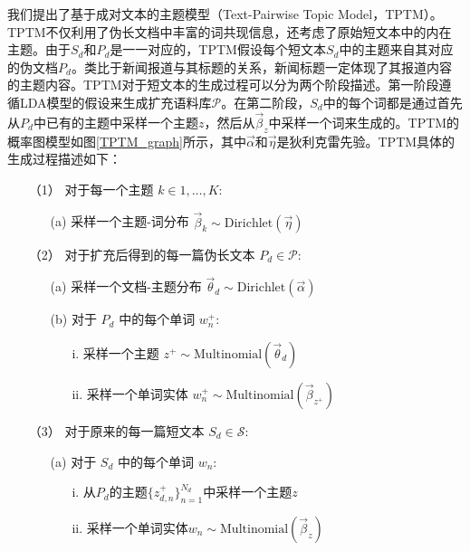 我们提出了基于成对文本的主题模型（Text-Pairwise Topic Model，TPTM）。TPTM不仅利用了伪长文档中丰富的词共现信息，还考虑了原始短文本中的内在主题。由于$S_d$和$P_d$是一一对应的，TPTM假设每个短文本$S_d$中的主题来自其对应的伪文档$P_d$。类比于新闻报道与其标题的关系，新闻标题一定体现了其报道内容的主题内容。TPTM对于短文本的生成过程可以分为两个阶段描述。第一阶段遵循LDA模型的假设来生成扩充语料库$\mathcal{P}$。在第二阶段，$S_d$中的每个词都是通过首先从$P_d$中已有的主题中采样一个主题$z$，然后从$\vec\beta_z$中采样一个词来生成的。TPTM的概率图模型如图\ref{TPTM_graph}所示，其中$\vec \alpha$和$\vec\eta$是狄利克雷先验。TPTM具体的生成过程描述如下：

\pagebreak

\begin{itemize}[]
    \item[（1）] 对于每一个主题 $k\in {1,\dots,K}$:
    \begin{itemize}
        \item[(a)] 采样一个主题-词分布 $\vec\beta_k\sim \mbox{Dirichlet}(\vec\eta)$ 
    \end{itemize}
    \item[（2）] 对于扩充后得到的每一篇伪长文本 $P_d \in \mathcal{P}$:
    \begin{itemize}
        \item[(a)] 采样一个文档-主题分布 $\vec\theta_d\sim \mbox{Dirichlet}(\vec\alpha)$
        \item[(b)] 对于 $P_d$ 中的每个单词 $w_{n}^+$:
        \begin{itemize}
            \item[i.] 采样一个主题 $z^+\sim \mbox{Multinomial}(\vec\theta_d)$
            \item[ii.] 采样一个单词实体 $w_{n}^+\sim \mbox{Multinomial}(\vec\beta_{z^+})$
        \end{itemize}
    \end{itemize}
    \item[（3）] 对于原来的每一篇短文本 $S_d \in \mathcal{S}$:
    \begin{itemize}
        \item[(a)] 对于 $S_d$ 中的每个单词 $w_{n}$:
        \begin{itemize}
            \item[i.] 从$P_d$的主题$\{z_{d,n}^+\}_{n=1}^{N_d}$中采样一个主题$z$
            \item[ii.] 采样一个单词实体$w_{n}\sim \mbox{Multinomial}(\vec\beta_z)$
        \end{itemize}
    \end{itemize}
\end{itemize}

